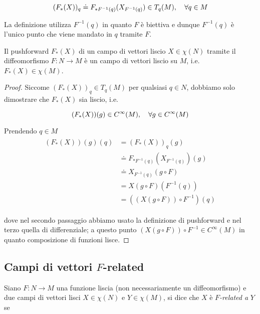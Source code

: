 \begin{equation}
	(F_{*}(X))_{q} \doteq F_{*F^{-1}(q)} (X_{F^{-1}(q)}) \in T_{q}(M) \qcomma \forall q \in M
\end{equation}

La definizione utilizza $ F^{-1}(q) $ in quanto $ F $ è biettiva e dunque $ F^{-1}(q) $ è l'unico punto che viene mandato in $ q $ tramite $ F $.

\begin{definition}
	Il pushforward $ F_{*}(X) $ di un campo di vettori liscio $ X \in \chi(N) $ tramite il diffeomorfismo $ F : N \to M $ è un campo di vettori liscio su $ M $, i.e. $ F_{*}(X) \in \chi(M) $.
\end{definition}

\begin{proof}
	Siccome $ (F_{*} (X))_{q} \in T_{q}(M) $ per qualsiasi $ q \in N $, dobbiamo solo dimostrare che $ F_{*}(X) $ sia liscio, i.e.
	
	\begin{equation}
		(F_{*}(X))(g) \in C^{\infty}(M) \qcomma \forall g \in C^{\infty}(M)
	\end{equation}

	Prendendo $ q \in M $
	\begin{align}
		\begin{split}
			(F_{*}(X))(g)(q) &= (F_{*}(X))_{q}(g) \\
			&\doteq F_{*F^{-1}(q)} (X_{F^{-1}(q)})(g) \\
			&\doteq X_{F^{-1}(q)} (g \circ F) \\
			&= X (g \circ F)(F^{-1}(q)) \\
			&= ((X (g \circ F)) \circ F^{-1})(q)
		\end{split}
	\end{align}

	dove nel secondo passaggio abbiamo usato la definizione di pushforward e nel terzo quella di differenziale; a questo punto $ (X (g \circ F)) \circ F^{-1} \in C^{\infty}(M) $ in quanto composizione di funzioni lisce.
\end{proof}

\subsection{Campi di vettori $ F $-related}

Siano $ F : N \to M $ una funzione liscia (non necessariamente un diffeomorfismo) e due campi di vettori lisci $ X \in \chi(N) $ e $ Y \in \chi(M) $, si dice che $ X $ è $ F $\textit{-related a} $ Y $ se

